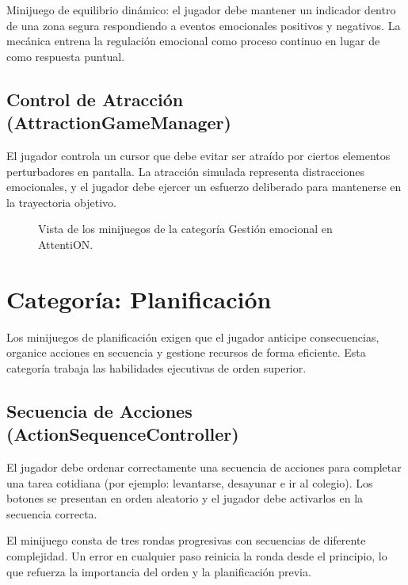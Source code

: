 \documentclass[12pt, a4paper]{report}
\begin{document}
Minijuego de equilibrio dinámico: el jugador debe mantener un indicador
dentro de una zona segura respondiendo a eventos emocionales positivos y
negativos. La mecánica entrena la regulación emocional como proceso continuo
en lugar de como respuesta puntual.

\subsection{Control de Atracción (AttractionGameManager)}

El jugador controla un cursor que debe evitar ser atraído por ciertos
elementos perturbadores en pantalla. La atracción simulada representa
distracciones emocionales, y el jugador debe ejercer un esfuerzo deliberado
para mantenerse en la trayectoria objetivo.

\begin{figure}[H]
  \centering
  \caption{Vista de los minijuegos de la categoría Gestión emocional en AttentiON.}
  \label{fig:emocional}
\end{figure}

\section{Categoría: Planificación}

Los minijuegos de planificación exigen que el jugador anticipe consecuencias,
organice acciones en secuencia y gestione recursos de forma eficiente. Esta
categoría trabaja las habilidades ejecutivas de orden superior.

\subsection{Secuencia de Acciones (ActionSequenceController)}

El jugador debe ordenar correctamente una secuencia de acciones para completar
una tarea cotidiana (por ejemplo: levantarse, desayunar e ir al colegio). Los
botones se presentan en orden aleatorio y el jugador debe activarlos en la
secuencia correcta.

El minijuego consta de tres rondas progresivas con secuencias de diferente
complejidad. Un error en cualquier paso reinicia la ronda desde el principio,
lo que refuerza la importancia del orden y la planificación previa.
\end{document}
